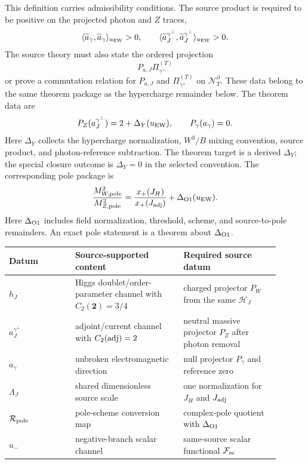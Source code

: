 This definition carries admissibility conditions.  The source product is
required to be positive on the projected photon and \(Z\) traces,
\begin{equation}
  \langle\widetilde a_\gamma,\widetilde a_\gamma\rangle_{u_{\rm EW}}>0,
  \qquad
  \langle\widetilde a_J^{\gamma^\perp},
  \widetilde a_J^{\gamma^\perp}\rangle_{u_{\rm EW}}>0.
  \label{eq:neutral-trace-nonzero-norms}
\end{equation}
The source theory must also state the ordered projection
\[
  P_{a,J}\Pi_{\gamma^\perp}^{(T)}
\]
or prove a commutation relation for \(P_{a,J}\) and
\(\Pi_{\gamma^\perp}^{(T)}\) on \(\mathcal N_T^\partial\).  These data belong
to the same theorem package as the hypercharge remainder below.  The theorem
data are
\begin{equation}
  P_Z(a_J^{\gamma^\perp})=2+\Delta_Y(u_{\rm EW}),
  \qquad
  P_\gamma(a_\gamma)=0.
  \label{eq:neutral-hypercharge-remainder}
\end{equation}
Here \(\Delta_Y\) collects the hypercharge normalization, \(W^3/B\) mixing
convention, source product, and photon-reference subtraction.  The theorem
target is a derived \(\Delta_Y\); the special closure outcome is
\(\Delta_Y=0\) in the selected convention.
The corresponding pole package is
\begin{equation}
  \frac{M_{W,\rm pole}^2}{M_{Z,\rm pole}^2}
  =
  \frac{x_+(J_H)}{x_+(J_{\rm adj})}
  +\Delta_{\rm O1}(u_{\rm EW}) .
  \label{eq:o1-pole-package}
\end{equation}
Here \(\Delta_{\rm O1}\) includes field normalization, threshold, scheme, and
source-to-pole remainders.  An exact pole statement is a theorem about
\(\Delta_{\rm O1}\).

\begin{center}
\begin{tabular}{p{0.22\linewidth}p{0.36\linewidth}p{0.32\linewidth}}
\toprule
Datum & Source-supported content & Required source datum \\
\midrule
\(h_J\) & Higgs doublet/order-parameter channel with \(C_2(\mathbf 2)=3/4\) & charged projector \(P_W\) from the same \(\mathcal H_J\) \\
\(a_J^{\gamma^\perp}\) & adjoint/current channel with \(C_2({\rm adj})=2\) & neutral massive projector \(P_Z\) after photon removal \\
\(a_\gamma\) & unbroken electromagnetic direction & null projector \(P_\gamma\) and reference zero \\
\(\Lambda_J\) & shared dimensionless source scale & one normalization for \(J_H\) and \(J_{\rm adj}\) \\
\(\mathcal R_{\rm pole}\) & pole-scheme conversion map & complex-pole quotient with \(\Delta_{\rm O1}\) \\
\(u_-\) & negative-branch scalar channel & same-source scalar functional \(\mathcal F_{\rm sc}\) \\
\bottomrule
\end{tabular}
\end{center}

